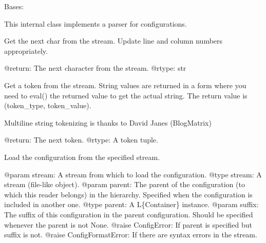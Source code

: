 \documentclass[a4paper,10pt,english]{sphinxmanual}
\begin{document}
\begin{fulllineitems}
\label{commands/apidoc/src:src.pyconf.ConfigReader}
Bases: 

This internal class implements a parser for configurations.

\begin{fulllineitems}
\label{commands/apidoc/src:src.pyconf.ConfigReader.getChar}
Get the next char from the stream. Update line and column numbers
appropriately.

@return: The next character from the stream.
@rtype: str

\end{fulllineitems}


\begin{fulllineitems}
\label{commands/apidoc/src:src.pyconf.ConfigReader.getToken}
Get a token from the stream. String values are returned in a form
where you need to eval() the returned value to get the actual
string. The return value is (token\_type, token\_value).

Multiline string tokenizing is thanks to David Janes (BlogMatrix)

@return: The next token.
@rtype: A token tuple.

\end{fulllineitems}


\begin{fulllineitems}
\label{commands/apidoc/src:src.pyconf.ConfigReader.load}
Load the configuration from the specified stream.

@param stream: A stream from which to load the configuration.
@type stream: A stream (file-like object).
@param parent: The parent of the configuration (to which this reader
belongs) in the hierarchy. Specified when the configuration is
included in another one.
@type parent: A L\{Container\} instance.
@param suffix: The suffix of this configuration in the parent
configuration. Should be specified whenever the parent is not None.
@raise ConfigError: If parent is specified but suffix is not.
@raise ConfigFormatError: If there are syntax errors in the stream.


\end{fulllineitems}
\end{fulllineitems}
\end{document}
